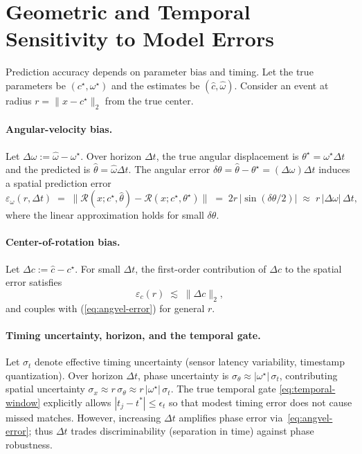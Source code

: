 \section{Geometric and Temporal Sensitivity to Model Errors}
Prediction accuracy depends on parameter bias and timing. Let the true parameters be $(c^\star,\omega^\star)$ and the estimates be $(\hat c,\hat\omega)$. Consider an event at radius $r=\|x-c^\star\|_2$ from the true center.

\paragraph{Angular-velocity bias.}
Let $\Delta\omega := \hat\omega-\omega^\star$. Over horizon $\Delta t$, the true angular displacement is $\theta^\star=\omega^\star \Delta t$ and the predicted is $\hat\theta=\hat\omega \Delta t$. The angular error $\delta\theta=\hat\theta-\theta^\star=(\Delta\omega)\Delta t$ induces a spatial prediction error
\begin{equation}
\varepsilon_{\omega}(r,\Delta t) \;=\; \big\|\mathcal{R}(x;c^\star,\hat\theta)-\mathcal{R}(x;c^\star,\theta^\star)\big\|
\;=\; 2r\,\big|\sin(\delta\theta/2)\big|
\;\approx\; r\,|\Delta\omega|\,\Delta t,
\label{eq:angvel-error}
\end{equation}
where the linear approximation holds for small $\delta\theta$.

\paragraph{Center-of-rotation bias.}
Let $\Delta c := \hat c - c^\star$. For small $\Delta t$, the first-order contribution of $\Delta c$ to the spatial error satisfies
\begin{equation}
\varepsilon_{c}(r) \;\lesssim\; \|\Delta c\|_2,
\label{eq:center-error}
\end{equation}
and couples with (\ref{eq:angvel-error}) for general $r$.

\paragraph{Timing uncertainty, horizon, and the temporal gate.}
Let $\sigma_t$ denote effective timing uncertainty (sensor latency variability, timestamp quantization). Over horizon $\Delta t$, phase uncertainty is $\sigma_\theta \approx |\omega^\star|\,\sigma_t$, contributing spatial uncertainty $\sigma_x \approx r\,\sigma_\theta \approx r\,|\omega^\star|\,\sigma_t$. The true temporal gate \eqref{eq:temporal-window} explicitly allows $|t_j-t^*|\le \epsilon_t$ so that modest timing error does not cause missed matches. However, increasing $\Delta t$ amplifies phase error via~\eqref{eq:angvel-error}; thus $\Delta t$ trades discriminability (separation in time) against phase robustness.

